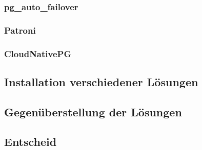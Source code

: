 \subsubsection{pg\_auto\_failover}
\subsubsection{Patroni}
\subsubsection{CloudNativePG}
\subsection{Installation verschiedener Lösungen}
\subsection{Gegenüberstellung der Lösungen}
\subsection{Entscheid}